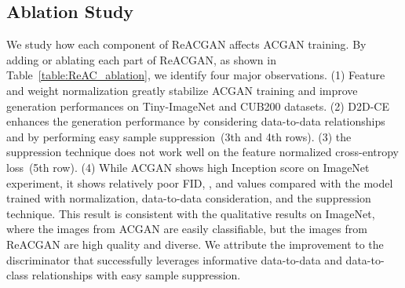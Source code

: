 \documentclass{article}
\begin{document}
\subsection{Ablation Study}
\label{sec:ablation}
We study how each component of ReACGAN affects ACGAN training. By adding or ablating each part of ReACGAN, as shown in Table~\ref{table:ReAC_ablation}, we identify four major observations. (1) Feature and weight normalization greatly stabilize ACGAN training and improve generation performances on Tiny-ImageNet and CUB200 datasets. (2) D2D-CE enhances the generation performance by considering data-to-data relationships and by performing easy sample suppression~(3th and 4th rows). (3) the suppression technique does not work well on the feature normalized cross-entropy loss~(5th row). (4) While ACGAN shows high Inception score on ImageNet experiment, 
it shows relatively poor FID, , and  values compared with the model trained with normalization, data-to-data consideration, and the suppression technique. This result is consistent with the qualitative results on ImageNet, where the images from ACGAN are easily classifiable, but the images from ReACGAN are high quality and diverse. We attribute the improvement to the discriminator that successfully leverages informative data-to-data and data-to-class relationships with easy sample suppression.
\end{document}
